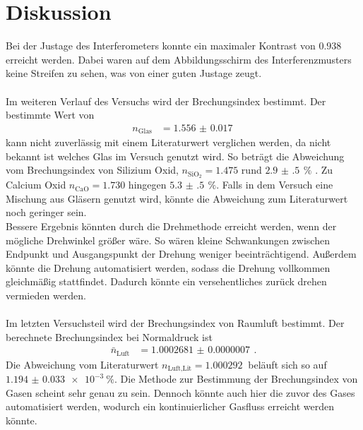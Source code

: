 \newpage
\section{Diskussion}
\label{sec:diskussion}
Bei der Justage des Interferometers konnte ein maximaler Kontrast von $0.938$ erreicht werden.
Dabei waren auf dem Abbildungsschirm des Interferenzmusters keine Streifen zu sehen, was von einer guten Justage zeugt.\\\\
Im weiteren Verlauf des Versuchs wird der Brechungsindex bestimmt.
Der bestimmte Wert von 
\begin{align}
    n_\text{Glas} &= \SI{1.556(17)}{}
\end{align}
kann nicht zuverlässig mit einem Literaturwert verglichen werden, da nicht bekannt ist welches Glas im Versuch genutzt wird.
So beträgt die Abweichung vom Brechungsindex von Silizium Oxid, $n_{\text{SiO}_2} = 1.475$ rund $\SI{2.9(5)}{} \,\%$ \cite{Teschner2019}.
Zu Calcium Oxid $n_\text{CaO} = 1.730$ hingegen $\SI{5.3(5)}{}\,\%$.
Falls in dem Versuch eine Mischung aus Gläsern genutzt wird, könnte die Abweichung zum Literaturwert noch geringer sein.\\
Bessere Ergebnis könnten durch die Drehmethode erreicht werden, wenn der mögliche Drehwinkel größer wäre.
So wären kleine Schwankungen zwischen Endpunkt und Ausgangspunkt der Drehung weniger beeinträchtigend.
Außerdem könnte die Drehung automatisiert werden, sodass die Drehung vollkommen gleichmäßig stattfindet.
Dadurch könnte ein versehentliches zurück drehen vermieden werden.\\\\
Im letzten Versuchsteil wird der Brechungsindex von Raumluft bestimmt.
Der berechnete Brechungsindex bei Normaldruck ist
\begin{align*}
    \bar{n}_\text{Luft} &= \SI{1.0002681(07)}{}\,.
\end{align*}
Die Abweichung vom Literaturwert ${n_\text{Luft,Lit} = \SI{1.000292}{}}$ \cite{Dem2} beläuft sich so auf ${\SI{1.194(33)e-3}{\percent}}$.
Die Methode zur Bestimmung der Brechungsindex von Gasen scheint sehr genau zu sein.
Dennoch könnte auch hier die zuvor des Gases automatisiert werden, wodurch ein kontinuierlicher Gasfluss erreicht werden könnte.